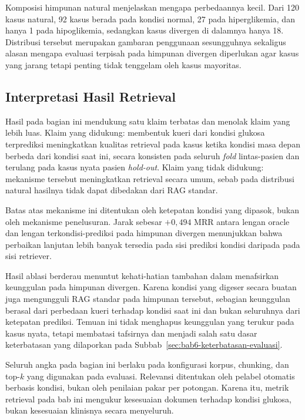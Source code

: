Komposisi himpunan natural menjelaskan mengapa perbedaannya kecil. Dari 120 kasus natural, 92 kasus berada pada kondisi normal, 27 pada hiperglikemia, dan hanya
1 pada hipoglikemia, sedangkan kasus divergen di dalamnya hanya 18. Distribusi tersebut merupakan gambaran penggunaan sesungguhnya sekaligus alasan mengapa
evaluasi terpisah pada himpunan divergen diperlukan agar kasus yang jarang tetapi penting tidak tenggelam oleh kasus mayoritas.

\subsection{Interpretasi Hasil Retrieval}
\label{subsec:bab6-interpretasi-hasil-retrieval}

Hasil pada bagian ini mendukung satu klaim terbatas dan menolak klaim yang lebih luas. Klaim yang didukung: membentuk kueri dari kondisi glukosa terprediksi
meningkatkan kualitas retrieval pada kasus ketika kondisi masa depan berbeda dari kondisi saat ini, secara konsisten pada seluruh \textit{fold} lintas-pasien
dan terulang pada kasus nyata pasien \textit{hold-out}. Klaim yang tidak didukung: mekanisme tersebut meningkatkan retrieval secara umum, sebab pada distribusi
natural hasilnya tidak dapat dibedakan dari RAG standar.

Batas atas mekanisme ini ditentukan oleh ketepatan kondisi yang dipasok, bukan oleh mekanisme penelusuran. Jarak sebesar $+0,494$ MRR antara lengan oracle dan
lengan terkondisi-prediksi pada himpunan divergen menunjukkan bahwa perbaikan lanjutan lebih banyak tersedia pada sisi prediksi kondisi daripada pada sisi
retriever.

Hasil ablasi berderau menuntut kehati-hatian tambahan dalam menafsirkan keunggulan pada himpunan divergen. Karena kondisi yang digeser secara buatan juga
mengungguli RAG standar pada himpunan tersebut, sebagian keunggulan berasal dari perbedaan kueri terhadap kondisi saat ini dan bukan seluruhnya dari ketepatan
prediksi. Temuan ini tidak menghapus keunggulan yang terukur pada kasus nyata, tetapi membatasi tafsirnya dan menjadi salah satu dasar keterbatasan yang
dilaporkan pada Subbab~\ref{sec:bab6-keterbatasan-evaluasi}.

Seluruh angka pada bagian ini berlaku pada konfigurasi korpus, chunking, dan top-\(k\) yang digunakan pada evaluasi. Relevansi ditentukan oleh pelabel otomatis berbasis kondisi, bukan oleh penilaian pakar per potongan. Karena itu, metrik retrieval pada bab ini mengukur
kesesuaian dokumen terhadap kondisi glukosa, bukan kesesuaian klinisnya secara menyeluruh.

